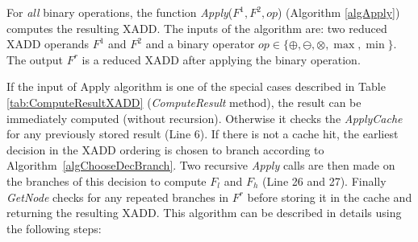 \documentclass[twoside,11pt]{article}
\begin{document}
For \emph{all} binary operations, the function \emph{Apply}($F^1,F^2,\mathit{op}$) (Algorithm \ref{algApply}) computes the resulting XADD. 
The inputs of the algorithm are: two reduced XADD operands $F^1$ and $F^2$ and a binary operator $\mathit{op} \in \{ \oplus, \ominus, \otimes , \max , \min \} $. The output $F^r$ is a reduced XADD after applying the binary operation. 

If the input of Apply algorithm is one of the special cases described in Table  \ref{tab:ComputeResultXADD} (\emph{ComputeResult} method), the result can be immediately computed (without recursion). Otherwise it checks the \emph{ApplyCache} for any previously stored result (Line 6).  If there is not a cache hit, the earliest decision in the XADD ordering is chosen to branch according to Algorithm~\ref{algChooseDecBranch}. Two recursive \emph{Apply} calls are then made on the branches of this decision to compute $F_l$ and $F_h$ (Line 26 and 27). Finally \emph{GetNode} checks for any repeated branches in $F^r$ before storing it in the cache and returning the resulting XADD. 
This algorithm can be described in details using the following steps:
\end{document}
